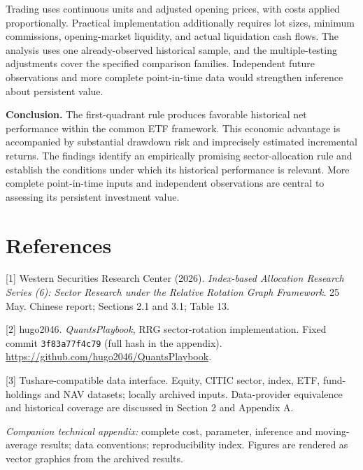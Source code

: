 Trading uses continuous units and adjusted opening prices, with costs applied proportionally. Practical implementation additionally requires lot sizes, minimum commissions, opening-market liquidity, and actual liquidation cash flows. The analysis uses one already-observed historical sample, and the multiple-testing adjustments cover the specified comparison families. Independent future observations and more complete point-in-time data would strengthen inference about persistent value.

\textbf{Conclusion.} The first-quadrant rule produces favorable historical net performance within the common ETF framework. This economic advantage is accompanied by substantial drawdown risk and imprecisely estimated incremental returns. The findings identify an empirically promising sector-allocation rule and establish the conditions under which its historical performance is relevant. More complete point-in-time inputs and independent observations are central to assessing its persistent investment value.

\section*{References}
\begingroup\footnotesize\setlength{\parskip}{3pt}
[1] Western Securities Research Center (2026). \emph{Index-based Allocation Research Series (6): Sector Research under the Relative Rotation Graph Framework}. 25 May. Chinese report; Sections 2.1 and 3.1; Table 13.

[2] hugo2046. \emph{QuantsPlaybook}, RRG sector-rotation implementation. Fixed commit \texttt{3f83a77f4c79} (full hash in the appendix). \url{https://github.com/hugo2046/QuantsPlaybook}.

[3] Tushare-compatible data interface. Equity, CITIC sector, index, ETF, fund-holdings and NAV datasets; locally archived inputs. Data-provider equivalence and historical coverage are discussed in Section 2 and Appendix A.

\textit{Companion technical appendix:} complete cost, parameter, inference and moving-average results; data conventions; reproducibility index. Figures are rendered as vector graphics from the archived results.
\endgroup

